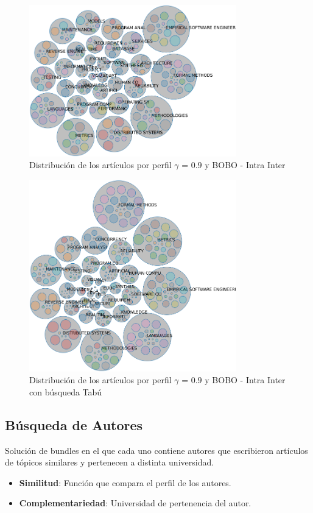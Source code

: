 \begin{figure}[H]
  \centering
    \includegraphics[width=0.8\textwidth]{resultados/papers/BOBO/INTRA_INTER/bubbles-gamma-09.png}
  \caption{Distribución de los artículos por perfil $\gamma$ = $0.9$ y BOBO - Intra Inter}
  \label{res:img-papers-bubbles-gamma09-bobo-intra-inter}
\end{figure}

\begin{figure}[H]
  \centering
    \includegraphics[width=0.8\textwidth]{resultados/papers/BOBO/INTRA_INTER/bubbles-gamma-with-local-09.png}
  \caption{Distribución de los artículos por perfil $\gamma$ = $0.9$ y BOBO - Intra Inter con búsqueda Tabú}
  \label{res:img-papers-bubbles-gamma09-hac-intra-inter-bobo}
\end{figure}
\newpage
\subsection{Búsqueda de Autores}
Solución de bundles en el que cada uno contiene autores que escribieron artículos de tópicos similares y pertenecen a distinta universidad.\\
\begin{itemize}
  \item \textbf{Similitud}: Función que compara el perfil de los autores.
  \item \textbf{Complementariedad}: Universidad de pertenencia del autor.
\end{itemize}

